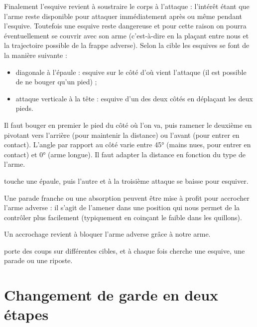 Finalement l'esquive revient à soustraire le corps à l'attaque : l'intérêt étant que l'arme reste disponible pour attaquer immédiatement après ou même pendant l'esquive.
Toutefois une esquive reste dangereuse et pour cette raison on pourra éventuellement se couvrir avec son arme (c'est-à-dire en la plaçant entre nous et la trajectoire possible de la frappe adverse).
Selon la cible les esquives se font de la manière suivante :
\begin{itemize}
	\item diagonale à l'épaule : esquive sur le côté d'où vient l'attaque (il est possible de ne bouger qu'un pied) ;
	\item attaque verticale à la tête : esquive d'un des deux côtés en déplaçant les deux pieds.
\end{itemize}
Il faut bouger en premier le pied du côté où l'on va, puis ramener le deuxième en pivotant vers l'arrière (pour maintenir la distance) ou l'avant (pour entrer en contact).
L'angle par rapport au côté varie entre \ang{45} (mains nues, pour entrer en contact) et \ang{0} (arme longue).
Il faut adapter la distance en fonction du type de l'arme.


\begin{exercice}
	\A touche une épaule, puis l'autre et à la troisième attaque \D se baisse pour esquiver.
\end{exercice}


Une parade franche ou une absorption peuvent être mise à profit pour accrocher l'arme adverse : il s'agit de l'amener dans une position qui nous permet de la contrôler plus facilement (typiquement en coinçant le faible dans les quillons).


\begin{definition}[Accrochage]

	Un accrochage revient à bloquer l'arme adverse grâce à notre arme.
	\end{definition}


	\begin{exercice}
	\A porte des coups sur différentes cibles, et à chaque fois \D cherche une esquive, une parade ou une riposte.
\end{exercice}



\section{Changement de garde en deux étapes}


